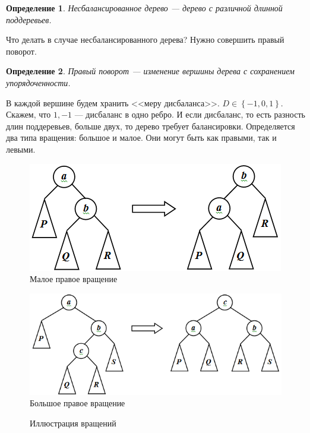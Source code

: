 \documentclass[a4paper,12pt]{article}
\newtheorem{defenition}{Определение}
\begin{document}
	\begin{defenition}
		Несбалансированное дерево --- дерево с различной длинной поддеревьев.
	\end{defenition}
	Что делать в случае несбалансированного дерева? Нужно совершить правый поворот.
	\begin{defenition}
		Правый поворот --- изменение вершины дерева с сохранением упорядоченности.
	\end{defenition}
	В каждой вершине будем хранить <<меру дисбаланса>>. $D\in \left\lbrace-1, 0, 1 \right\rbrace$. Скажем, что $1, -1$ --- дисбаланс в одно ребро. И если дисбаланс, то есть разность длин поддеревьев, больше двух, то дерево требует балансировки.
	Определяется два типа вращения: большое и малое. Они могут быть как правыми, так и левыми.
	
	\begin{figure}[h]
		\begin{minipage}[h]{0.49\linewidth}
			\centering
			{\includegraphics[width=0.5\linewidth]{small} \\ Малое правое вращение}
		\end{minipage}
		\hfill
		\begin{minipage}[h]{0.49\linewidth}
			\centering
			{\includegraphics[width=0.5\linewidth]{big} \\ Большое правое вращение}
		\end{minipage}
		\caption{Иллюстрация вращений}
		\label{ris:image1}
	\end{figure}
	
	
	
\end{document}
